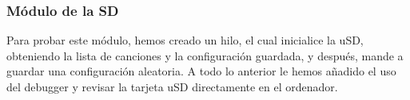 \subsubsection{Módulo de la SD}

Para probar este módulo, hemos creado un hilo, el cual inicialice la uSD, obteniendo la lista de canciones y la configuración guardada, y después, mande a guardar una configuración aleatoria. A todo lo anterior le hemos añadido el uso del debugger y revisar la tarjeta uSD directamente en el ordenador.
